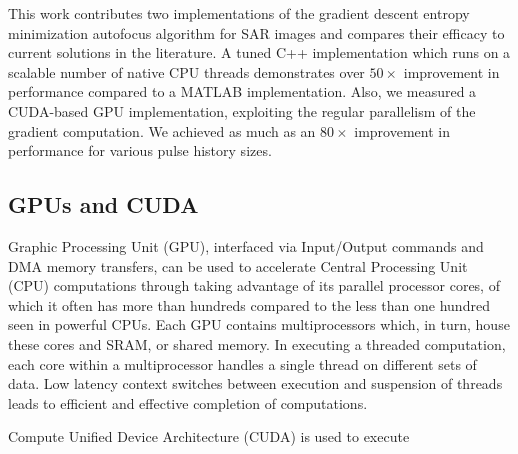 This work contributes two implementations of the gradient descent entropy
minimization autofocus algorithm for SAR images and compares their efficacy to
current solutions in the literature. A tuned C++ implementation which runs on a
scalable number of native CPU threads demonstrates over $50\times$ improvement in
performance compared to a MATLAB implementation. Also, we measured a CUDA-based
GPU implementation, exploiting the regular parallelism of the gradient
computation. We achieved as much as an $80\times$ improvement in performance
for various pulse history sizes.

\subsection{GPUs and CUDA}

Graphic Processing Unit (GPU), interfaced via Input/Output commands and DMA
memory transfers, can be used to accelerate Central Processing Unit (CPU)
computations through taking advantage of its parallel processor cores, of
which it often has more than hundreds compared to the less than one hundred
seen in powerful CPUs. Each GPU contains multiprocessors which, in turn, house
these cores and SRAM, or shared memory. In executing a threaded computation,
each core within a multiprocessor handles a single thread on different sets of
data. Low latency context switches between execution and suspension of threads
leads to efficient and effective completion of computations.

Compute Unified Device Architecture (CUDA) is used to execute 
